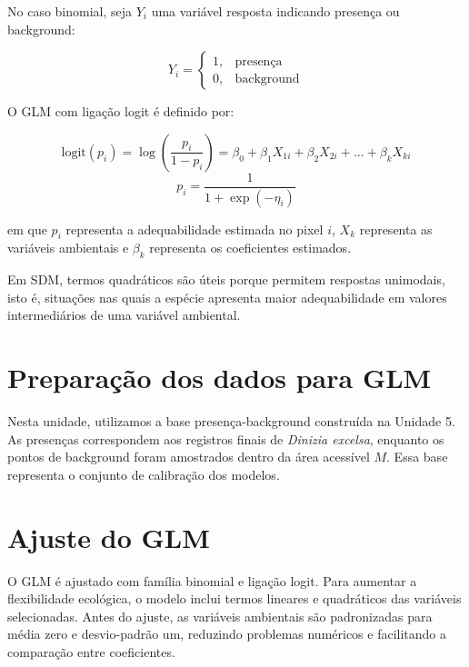 No caso binomial, seja \(Y_i\) uma variável resposta indicando presença ou background:

\[
Y_i =
\begin{cases}
	1, & \text{presença}\\
	0, & \text{background}
\end{cases}
\]

O GLM com ligação logit é definido por:

\begin{equationbox}
	\[
	\text{logit}(p_i)=
	\log\left(\frac{p_i}{1-p_i}\right)
	=
	\beta_0+\beta_1X_{1i}+\beta_2X_{2i}+...+\beta_kX_{ki}
	\]
	\[
	p_i=
	\frac{1}{1+\exp(-\eta_i)}
	\]
\end{equationbox}

em que \(p_i\) representa a adequabilidade estimada no pixel \(i\), \(X_k\) representa as variáveis ambientais e \(\beta_k\) representa os coeficientes estimados.

\begin{dica}[title={\faLightbulb\quad Termos quadráticos}]
	Em SDM, termos quadráticos são úteis porque permitem respostas unimodais, isto é, situações nas quais a espécie apresenta maior adequabilidade em valores intermediários de uma variável ambiental.
\end{dica}

\section{Preparação dos dados para GLM}

Nesta unidade, utilizamos a base presença-background construída na Unidade 5. As presenças correspondem aos registros finais de \textit{Dinizia excelsa}, enquanto os pontos de background foram amostrados dentro da área acessível \(M\). Essa base representa o conjunto de calibração dos modelos.



\section{Ajuste do GLM}

O GLM é ajustado com família binomial e ligação logit. Para aumentar a flexibilidade ecológica, o modelo inclui termos lineares e quadráticos das variáveis selecionadas. Antes do ajuste, as variáveis ambientais são padronizadas para média zero e desvio-padrão um, reduzindo problemas numéricos e facilitando a comparação entre coeficientes.

